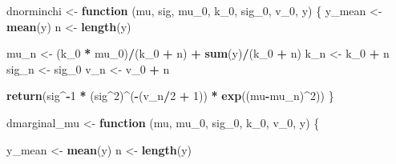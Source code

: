 \documentclass[]{book}
\newenvironment{Shaded}{\begin{snugshade}}{\end{snugshade}}
\newcommand{\KeywordTok}[1]{\textcolor[rgb]{0.13,0.29,0.53}{\textbf{#1}}}
\newcommand{\DecValTok}[1]{\textcolor[rgb]{0.00,0.00,0.81}{#1}}
\newcommand{\StringTok}[1]{\textcolor[rgb]{0.31,0.60,0.02}{#1}}
\newcommand{\ControlFlowTok}[1]{\textcolor[rgb]{0.13,0.29,0.53}{\textbf{#1}}}
\newcommand{\OperatorTok}[1]{\textcolor[rgb]{0.81,0.36,0.00}{\textbf{#1}}}
\newcommand{\NormalTok}[1]{#1}
\begin{document}
\begin{Shaded}
\begin{Highlighting}[]
\NormalTok{dnorminchi <-}\StringTok{ }\ControlFlowTok{function}\NormalTok{ (mu, sig, mu_}\DecValTok{0}\NormalTok{, k_}\DecValTok{0}\NormalTok{, sig_}\DecValTok{0}\NormalTok{, v_}\DecValTok{0}\NormalTok{, y) \{}
\NormalTok{  y_mean <-}\StringTok{ }\KeywordTok{mean}\NormalTok{(y)}
\NormalTok{  n <-}\StringTok{ }\KeywordTok{length}\NormalTok{(y)}
  
\NormalTok{  mu_n <-}\StringTok{ }\NormalTok{(k_}\DecValTok{0} \OperatorTok{*}\StringTok{ }\NormalTok{mu_}\DecValTok{0}\NormalTok{)}\OperatorTok{/}\NormalTok{(k_}\DecValTok{0} \OperatorTok{+}\StringTok{ }\NormalTok{n) }\OperatorTok{+}\StringTok{ }\KeywordTok{sum}\NormalTok{(y)}\OperatorTok{/}\NormalTok{(k_}\DecValTok{0} \OperatorTok{+}\StringTok{ }\NormalTok{n)}
\NormalTok{  k_n <-}\StringTok{ }\NormalTok{k_}\DecValTok{0} \OperatorTok{+}\StringTok{ }\NormalTok{n}
\NormalTok{  sig_n <-}\StringTok{ }\NormalTok{sig_}\DecValTok{0}
\NormalTok{  v_n <-}\StringTok{ }\NormalTok{v_}\DecValTok{0} \OperatorTok{+}\StringTok{ }\NormalTok{n}
  
  \KeywordTok{return}\NormalTok{(sig}\OperatorTok{^-}\DecValTok{1} \OperatorTok{*}\StringTok{ }\NormalTok{(sig}\OperatorTok{^}\DecValTok{2}\NormalTok{)}\OperatorTok{^}\NormalTok{(}\OperatorTok{-}\NormalTok{(v_n}\OperatorTok{/}\DecValTok{2} \OperatorTok{+}\StringTok{ }\DecValTok{1}\NormalTok{)) }\OperatorTok{*}\StringTok{ }
\StringTok{           }\KeywordTok{exp}\NormalTok{((mu}\OperatorTok{-}\NormalTok{mu_n)}\OperatorTok{^}\DecValTok{2}\NormalTok{))}
\NormalTok{\}}

\NormalTok{dmarginal_mu <-}\StringTok{ }\ControlFlowTok{function}\NormalTok{ (mu, mu_}\DecValTok{0}\NormalTok{, sig_}\DecValTok{0}\NormalTok{, k_}\DecValTok{0}\NormalTok{, v_}\DecValTok{0}\NormalTok{, y) \{}
  
\NormalTok{  y_mean <-}\StringTok{ }\KeywordTok{mean}\NormalTok{(y)}
\NormalTok{  n <-}\StringTok{ }\KeywordTok{length}\NormalTok{(y)}
  

\end{Highlighting}
\end{Shaded}
\end{document}
